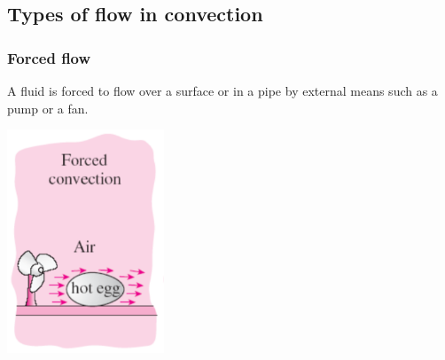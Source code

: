 \documentclass[11pt]{article}
\begin{document}
\subsection{Types of flow in convection}
\label{sec:org365b125}

\subsubsection{Forced flow}
\label{sec:org875e43e}
A fluid is forced to flow over a surface or in a pipe by external means such as a pump or a fan.
\begin{center}
\includegraphics[height=18em]{./images/forced-flow-diagram.png}
\end{center}
\end{document}
